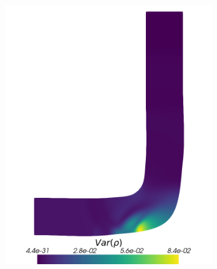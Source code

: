 \begin{figure}[H]
\begin{subfigure}{0.31\linewidth}
		\includegraphics[width=\linewidth]{figs/pipe/euler2D_pipe_adipm_n1-2_VarRho.png}
		\caption{}
		\label{fig:adIPMSolutionsPipeSGVar}
	\end{subfigure}
	\hfill
	\begin{subfigure}{0.31\linewidth}
		\centering

\end{subfigure}
\end{figure}
